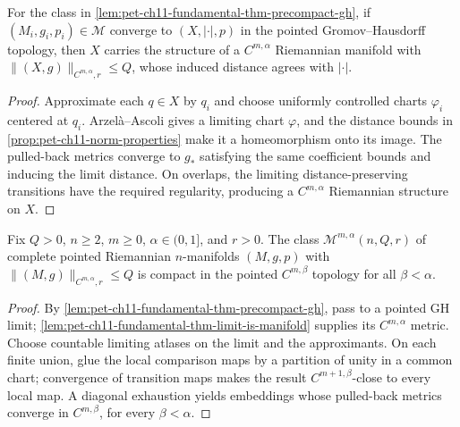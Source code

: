\begin{lemma}
  \label{lem:pet-ch11-fundamental-thm-limit-is-manifold}

  For the class in \cref{lem:pet-ch11-fundamental-thm-precompact-gh}, if
  $(M_i,g_i,p_i)\in\mathcal{M}$ converge to $(X,|\cdot|,p)$ in the pointed
  Gromov--Hausdorff topology, then $X$ carries the structure of a $C^{m,\alpha}$
  Riemannian manifold with $\|(X,g)\|_{C^{m,\alpha},r}\le Q$, whose induced
  distance agrees with $|\cdot|$.
\end{lemma}
\begin{proof}
  \sketch
  Approximate each \(q\in X\) by \(q_i\) and choose uniformly controlled
  charts \(\varphi_i\) centered at \(q_i\). Arzelà--Ascoli gives a limiting
  chart \(\varphi\), and the distance bounds in
  \cref{prop:pet-ch11-norm-properties} make it a homeomorphism onto its image.
  The pulled-back metrics converge to \(g_*\) satisfying the same coefficient
  bounds and inducing the limit distance. On overlaps, the limiting
  distance-preserving transitions have the required regularity, producing a
  \(C^{m,\alpha}\) Riemannian structure on \(X\).
\end{proof}


\begin{theorem}
  \label{thm:pet-ch11-fundamental-theorem-convergence}

  Fix $Q>0$, $n\ge2$, $m\ge0$, $\alpha\in(0,1]$, and $r>0$. The class
  $\mathcal{M}^{m,\alpha}(n,Q,r)$ of complete pointed Riemannian $n$-manifolds
  $(M,g,p)$ with $\|(M,g)\|_{C^{m,\alpha},r}\le Q$ is compact in the pointed
  $C^{m,\beta}$ topology for all $\beta<\alpha$.
\end{theorem}
\begin{proof}
  \sketch
  By \cref{lem:pet-ch11-fundamental-thm-precompact-gh}, pass to a pointed GH limit; \cref{lem:pet-ch11-fundamental-thm-limit-is-manifold} supplies its \(C^{m,\alpha}\) metric. Choose countable limiting atlases on the limit and the approximants. On each finite union, glue the local comparison maps by a partition of unity in a common chart; convergence of transition maps makes the result \(C^{m+1,\beta}\)-close to every local map. A diagonal exhaustion yields embeddings whose pulled-back metrics converge in \(C^{m,\beta}\), for every \(\beta<\alpha\).
\end{proof}


